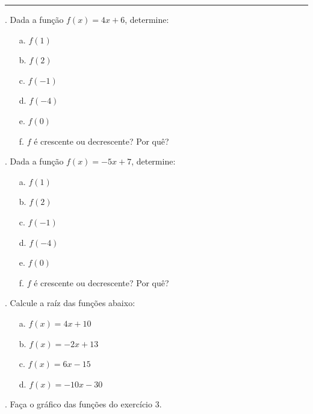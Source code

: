 \documentclass{article}
\newcommand{\resposta}{\hfill\makebox[0pt][r]{\scriptsize\textit{Resposta:\rule{5cm}{.1pt}}}\\ \vspace{.1cm}}
\begin{document}
\par\noindent\rule{\textwidth}{1pt}

\vspace{0.25 cm}

. Dada a função $f(x)=4x+6$, determine:
\begin{itemize}
	\item[a.]{$f(1)$}
	\item[b.]{$f(2)$}
	\item[c.]{$f(-1)$}
	\item[d.]{$f(-4)$}
	\item[e.]{$f(0)$}
	\item[f.]{$f$ é crescente ou decrescente? Por quê?}
\end{itemize}

. Dada a função $f(x)=-5x+7$, determine:
\begin{itemize}
	\item[a.]{$f(1)$}
	\item[b.]{$f(2)$}
	\item[c.]{$f(-1)$}
	\item[d.]{$f(-4)$}
	\item[e.]{$f(0)$}
	\item[f.]{$f$ é crescente ou decrescente? Por quê?}
\end{itemize}
. Calcule a raíz das funções abaixo:
\begin{itemize}
	\item[a.]{$f(x)=4x+10$}
	\item[b.]{$f(x)=-2x+13$}
	\item[c.]{$f(x)=6x-15$}
	\item[d.]{$f(x)=-10x-30$}
\end{itemize}
. Faça o gráfico das funções do exercício 3.
\end{document}
